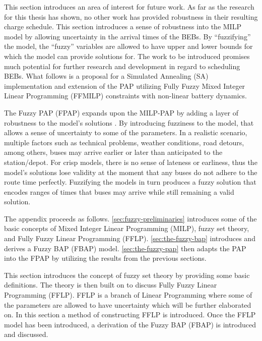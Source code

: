 \documentclass[ee,thesis]{usuthesis}
\begin{document}
This section introduces an area of interest for future work. As far as the research for this thesis has shown, no other
work has provided robustness in their resulting charge schedule. This section introduces a sense of robustness into the
MILP model by allowing uncertainty in the arrival times of the BEBs. By “fuzzifying” the model, the “fuzzy” variables
are allowed to have upper and lower bounds for which the model can provide solutions for. The work to be introduced
promises much potential for further research and development in regard to scheduling BEBs. What follows is a proposal
for a Simulated Annealing (SA) implementation and extension of the PAP utilizing Fully Fuzzy Mixed Integer Linear
Programming (FFMILP) constraints with non-linear battery dynamics.

The Fuzzy PAP (FPAP) expands upon the MILP-PAP by adding a layer of robustness to the model's solutions
\cite{bello-2019-fuzzy-activ,kaur-2016-introd-fuzzy}. By introducing fuzziness to the model, that allows a sense of
uncertainty to some of the parameters. In a realistic scenario, multiple factors such as technical problems, weather
conditions, road detours, among others, buses may arrive earlier or later than anticipated to the station/depot. For
crisp models, there is no sense of lateness or earliness, thus the model's solutions lose validity at the moment that
any buses do not adhere to the route time perfectly. Fuzzifying the models in turn produces a fuzzy solution that
encodes ranges of times that buses may arrive while still remaining a valid solution.

The appendix proceeds as follows. \ref{sec:fuzzy-preliminaries} introduces some of the basic concepts of Mixed Integer
Linear Programming (MILP), fuzzy set theory, and Fully Fuzzy Linear Programming (FFLP). \ref{sec:the-fuzzy-bap}
introduces and derives a Fuzzy BAP (FBAP) model. \ref{sec:the-fuzzy-pap} then adapts the PAP into the FPAP by utilizing
the results from the previous sections.

\label{sec:fuzzy-preliminaries}

This section introduces the concept of fuzzy set theory by providing some basic definitions. The theory is then built on to discuss Fully Fuzzy Linear Programming (FFLP). FFLP is a branch of Linear Programming where some of the parameters are allowed to have uncertainty which will be further elaborated on. In this section a method of constructing FFLP is introduced. Once the FFLP model has been introduced, a derivation of the Fuzzy BAP (FBAP) is introduced and discussed.
\end{document}
